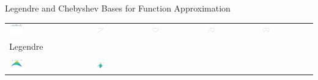 \documentclass[11pt,compress,xcolor={usenames,dvipsnames},aspectratio=169]{beamer}
\begin{document}
\begin{frame}{Legendre and Chebyshev Bases for Function Approximation}
\vspace{-3ex}
	\begin{tabular}{>{\centering}m{}>{\centering}m{}>{\centering}m{}>{\centering}m{}>{\centering}m{}}
		\includegraphics[width =0.18\textwidth]{ProgramsImages/Legendre_Degree_0.png}  &
		\includegraphics[width =0.18\textwidth]{ProgramsImages/Legendre_Degree_1.png}  &
		\includegraphics[width =0.18\textwidth]{ProgramsImages/Legendre_Degree_2.png}  &
		\includegraphics[width =0.18\textwidth]{ProgramsImages/Legendre_Degree_3.png}  &
		\includegraphics[width =0.18\textwidth]{ProgramsImages/Legendre_Degree_4.png} 
	\tabularnewline[-7ex]
	Legendre
	\tabularnewline
	\tabularnewline
		\includegraphics[width =0.18\textwidth]{ProgramsImages/Legendre_Degree_1_1.png}  &
\includegraphics[width =0.18\textwidth]{ProgramsImages/Legendre_Degree_1_2.png}  &

\end{tabular}
\end{frame}
\end{document}
